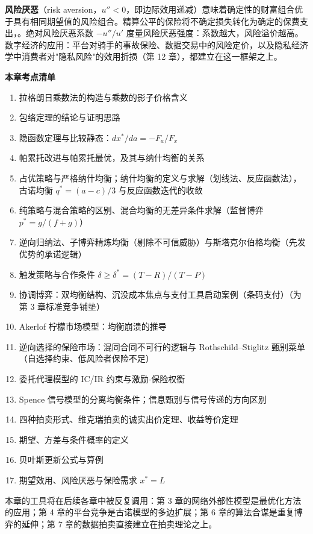 \textbf{风险厌恶}（risk aversion，$u'' < 0$，即边际效用递减）意味着确定性的财富组合优于具有相同期望值的风险组合。精算公平的保险将不确定损失转化为确定的保费支出，。绝对风险厌恶系数 $-u''/u'$ 度量风险厌恶强度：系数越大，风险溢价越高。数字经济的应用：平台对骑手的事故保险、数据交易中的风险定价，以及隐私经济学中消费者对"隐私风险"的效用折损（第 12 章），都建立在这一框架之上。
\begin{chapterbox}
\textbf{本章考点清单}

\begin{enumerate}
\item 拉格朗日乘数法的构造与乘数的影子价格含义 
\item 包络定理的结论与证明思路 
\item 隐函数定理与比较静态：$dx^*/da = -F_a/F_x$ 
\item 帕累托改进与帕累托最优，及其与纳什均衡的关系 
\item 占优策略与严格纳什均衡；纳什均衡的定义与求解（划线法、反应函数法），古诺均衡 $q^* = (a-c)/3$ 与反应函数迭代的收敛 
\item 纯策略与混合策略的区别、混合均衡的无差异条件求解（监督博弈 $p^* = g/(f+g)$）
\item 逆向归纳法、子博弈精炼均衡（剔除不可信威胁）与斯塔克尔伯格均衡（先发优势的承诺逻辑）
\item 触发策略与合作条件 $\delta \geq \delta^* = (T-R)/(T-P)$ 
\item 协调博弈：双均衡结构、沉没成本焦点与支付工具启动案例（条码支付）（为第 3 章标准竞争铺垫）
\item Akerlof 柠檬市场模型：均衡崩溃的推导 
\item 逆向选择的保险市场：混同合同不可行的逻辑与 Rothschild--Stiglitz 甄别菜单（自选择约束、低风险者保险不足）
\item 委托代理模型的 IC/IR 约束与激励-保险权衡 
\item Spence 信号模型的分离均衡条件；信息甄别与信号传递的方向区别 
\item 四种拍卖形式、维克瑞拍卖的诚实出价定理、收益等价定理 
\item 期望、方差与条件概率的定义 
\item 贝叶斯更新公式与算例 
\item 期望效用、风险厌恶与保险需求 $x^* = L$ 
\end{enumerate}
\end{chapterbox}

本章的工具将在后续各章中被反复调用：第 3 章的网络外部性模型是最优化方法的应用；第 4 章的平台竞争是古诺模型的多边扩展；第 6 章的算法合谋是重复博弈的延伸；第 7 章的数据拍卖直接建立在拍卖理论之上。
